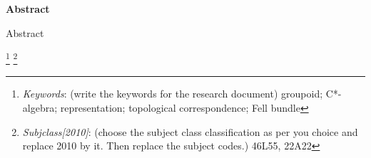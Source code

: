 
\begin{center}\Large{\textbf{Abstract}}\end{center}
Abstract




\let\thefootnote\relax\footnote{\emph{Keywords}: (write the keywords
  for the research document) groupoid; C*-algebra; representation;
  topological correspondence; Fell bundle}
\let\thefootnote\relax\footnote{\emph{Subjclass[2010]}: (choose the
  subject class classification as per you choice and replace 2010 by
  it. Then replace the subject codes.) 46L55, 22A22}